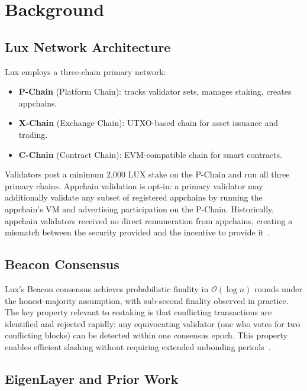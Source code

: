 \section{Background}

\label{sec:background}

\subsection{Lux Network Architecture}

Lux employs a three-chain primary network:
\begin{itemize}[leftmargin=1.5em]
  \item \textbf{P-Chain} (Platform Chain): tracks validator sets, manages staking, creates
    appchains.
  \item \textbf{X-Chain} (Exchange Chain): UTXO-based chain for asset issuance and trading.
  \item \textbf{C-Chain} (Contract Chain): EVM-compatible chain for smart contracts.
\end{itemize}

Validators post a minimum 2,000 LUX stake on the P-Chain and run all three primary chains.
Appchain validation is opt-in: a primary validator may additionally validate any subset of
registered appchains by running the appchain's VM and advertising participation on the P-Chain.
Historically, appchain validators received no direct remuneration from appchains, creating a
mismatch between the security provided and the incentive to provide it~\cite{lux2020platform}.

\subsection{Beacon Consensus}

Lux's Beacon consensus achieves probabilistic finality in $\mathcal{O}(\log n)$ rounds
under the honest-majority assumption, with sub-second finality observed in practice. The
key property relevant to restaking is that conflicting transactions are identified and
rejected rapidly: any equivocating validator (one who votes for two conflicting blocks) can
be detected within one consensus epoch. This property enables efficient slashing without
requiring extended unbonding periods~\cite{rocket2019wave}.

\subsection{EigenLayer and Prior Work}

